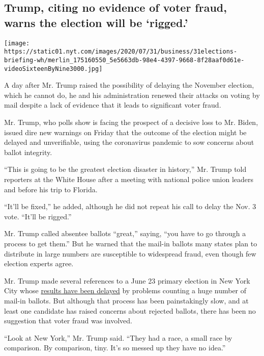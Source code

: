 \hypertarget{trump-citing-no-evidence-of-voter-fraud-warns-the-election-will-be-rigged}{%
\subsection{Trump, citing no evidence of voter fraud, warns the election
will be
`rigged.'}\label{trump-citing-no-evidence-of-voter-fraud-warns-the-election-will-be-rigged}}

\texttt{[image: https://static01.nyt.com/images/2020/07/31/business/31elections-briefing-wh/merlin\_175160550\_5e5663db-98e4-4397-9668-8f28aaf0d61e-videoSixteenByNine3000.jpg]}

A day after Mr. Trump raised the possibility of delaying the November
election, which he cannot do, he and his administration renewed their
attacks on voting by mail despite a lack of evidence that it leads to
significant voter fraud.

Mr. Trump, who polls show is facing the prospect of a decisive loss to
Mr. Biden, issued dire new warnings on Friday that the outcome of the
election might be delayed and unverifiable, using the coronavirus
pandemic to sow concerns about ballot integrity.

``This is going to be the greatest election disaster in history,'' Mr.
Trump told reporters at the White House after a meeting with national
police union leaders and before his trip to Florida.

``It'll be fixed,'' he added, although he did not repeat his call to
delay the Nov. 3 vote. ``It'll be rigged.''

Mr. Trump called absentee ballots ``great,'' saying, ``you have to go
through a process to get them.'' But he warned that the mail-in ballots
many states plan to distribute in large numbers are susceptible to
widespread fraud, even though few election experts agree.

Mr. Trump made several references to a June 23 primary election in New
York City whose
\href{https://www.nytimes.com/2020/07/17/nyregion/election-absentee-ballots-primary.html}{results
have been delayed} by problems counting a huge number of mail-in
ballots. But although that process has been painstakingly slow, and at
least one candidate has raised concerns about rejected ballots, there
has been no suggestion that voter fraud was involved.

``Look at New York,'' Mr. Trump said. ``They had a race, a small race by
comparison. By comparison, tiny. It's so messed up they have no idea.''

